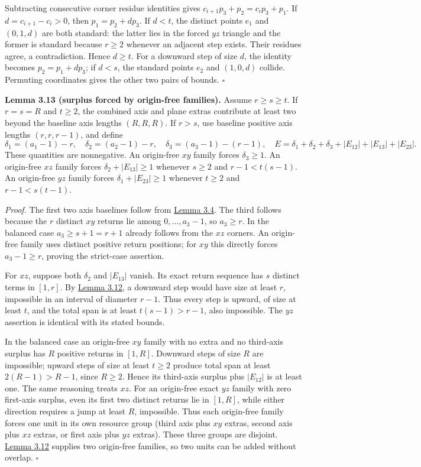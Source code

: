 \documentclass[11pt]{article}
\begin{document}
Subtracting consecutive corner residue identities gives
\(c_{i+1}p_3+p_2=c_ip_3+p_1\).
If \(d=c_{i+1}-c_i>0\), then \(p_1=p_2+dp_3\). If \(d<t\), the distinct points \(e_1\) and \((0,1,d)\) are both standard: the latter lies in the forced \(yz\) triangle and the former is standard because \(r\ge2\) whenever an adjacent step exists. Their residues agree, a contradiction. Hence \(d\ge t\). For a downward step of size \(d\), the identity becomes \(p_2=p_1+dp_3\); if \(d<s\), the standard points \(e_2\) and \((1,0,d)\) collide. Permuting coordinates gives the other two pairs of bounds. \ensuremath{\square}

\label{res:A.21}
\textbf{Lemma 3.13 (surplus forced by origin-free families).} Assume \(r\ge s\ge t\).
If \(r=s=R\) and \(t\ge2\), the combined axis and plane extras contribute at least two beyond the baseline axis lengths \((R,R,R)\).
If \(r>s\), use baseline positive axis lengths \((r,r,r-1)\), and define
\[
\delta_1=(a_1-1)-r,\quad\delta_2=(a_2-1)-r,
\quad\delta_3=(a_3-1)-(r-1),
\quad E=\delta_1+\delta_2+\delta_3+|E_{12}|+|E_{13}|+|E_{23}|.
\]
These quantities are nonnegative. An origin-free \(xy\) family forces \(\delta_3\ge1\). An origin-free \(xz\) family forces \(\delta_2+|E_{13}|\ge1\) whenever \(s\ge2\) and \(r-1<t(s-1)\). An origin-free \(yz\) family forces \(\delta_1+|E_{23}|\ge1\) whenever \(t\ge2\) and \(r-1<s(t-1)\).

\emph{Proof.} The first two axis baselines follow from \hyperref[res:A.3]{Lemma 3.4}. The third follows because the \(r\) distinct \(xy\) returns lie among \(0,\ldots,a_3-1\), so \(a_3\ge r\). In the balanced case \(a_3\ge s+1=r+1\) already follows from the \(xz\) corners. An origin-free family uses distinct positive return positions; for \(xy\) this directly forces \(a_3-1\ge r\), proving the strict-case assertion.

For \(xz\), suppose both \(\delta_2\) and \(|E_{13}|\) vanish. Its exact return sequence has \(s\) distinct terms in \([1,r]\). By \hyperref[res:A.20]{Lemma 3.12}, a downward step would have size at least \(r\), impossible in an interval of diameter \(r-1\). Thus every step is upward, of size at least \(t\), and the total span is at least \(t(s-1)>r-1\), also impossible. The \(yz\) assertion is identical with its stated bounds.

In the balanced case an origin-free \(xy\) family with no extra and no third-axis surplus has \(R\) positive returns in \([1,R]\). Downward steps of size \(R\) are impossible; upward steps of size at least \(t\ge2\) produce total span at least \(2(R-1)>R-1\), since \(R\ge2\). Hence its third-axis surplus plus \(|E_{12}|\) is at least one. The same reasoning treats \(xz\). For an origin-free exact \(yz\) family with zero first-axis surplus, even its first two distinct returns lie in \([1,R]\), while either direction requires a jump at least \(R\), impossible. Thus each origin-free family forces one unit in its own resource group (third axis plus \(xy\) extras, second axis plus \(xz\) extras, or first axis plus \(yz\) extras). These three groups are disjoint. \hyperref[res:A.20]{Lemma 3.12} supplies two origin-free families, so two units can be added without overlap. \ensuremath{\square}
\end{document}
